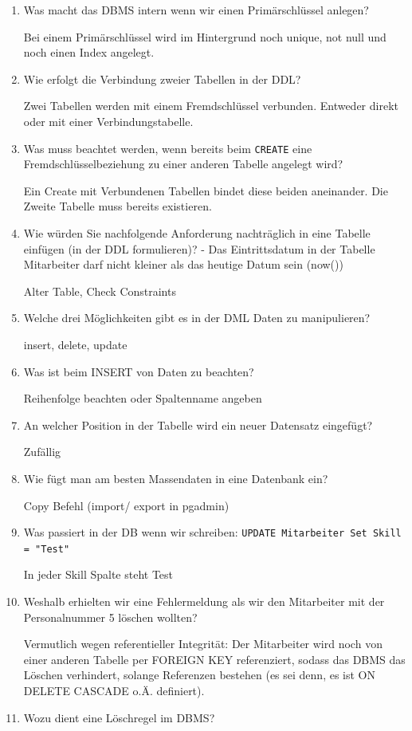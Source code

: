 \documentclass[a4paper]{article}
\begin{document}
\begin{enumerate}
    check, not null, default, unique, primary key, foreign key
    \item Was macht das DBMS intern wenn wir einen Primärschlüssel anlegen?
    
    Bei einem Primärschlüssel wird im Hintergrund noch unique, not null und noch einen Index angelegt.
    \item Wie erfolgt die Verbindung zweier Tabellen in der DDL?
    
    Zwei Tabellen werden mit einem Fremdschlüssel verbunden. Entweder direkt oder mit einer Verbindungstabelle.
    \item Was muss beachtet werden, wenn bereits beim \lstinline|CREATE| eine Fremdschlüsselbeziehung zu einer anderen Tabelle angelegt wird?
    
    Ein Create mit Verbundenen Tabellen bindet diese beiden aneinander. Die Zweite Tabelle muss bereits existieren.
    \item Wie würden Sie nachfolgende Anforderung nachträglich in eine Tabelle einfügen (in der DDL formulieren)? - Das Eintrittsdatum in der Tabelle Mitarbeiter darf nicht kleiner als das heutige Datum sein (now())
    
    Alter Table, Check Constraints
    \item Welche drei Möglichkeiten gibt es in der DML Daten zu manipulieren?
    
    insert, delete, update
    \item Was ist beim INSERT von Daten zu beachten?
    
    Reihenfolge beachten oder Spaltenname angeben
    \item An welcher Position in der Tabelle wird ein neuer Datensatz eingefügt?
    
    Zufällig
    \item Wie fügt man am besten Massendaten in eine Datenbank ein?
    
    Copy Befehl (import/ export in pgadmin)
    \item Was passiert in der DB wenn wir schreiben: \lstinline|UPDATE Mitarbeiter Set Skill = "Test"|
    
    In jeder Skill Spalte steht Test
    \item Weshalb erhielten wir eine Fehlermeldung als wir den Mitarbeiter mit der Personalnummer 5 löschen wollten?

    Vermutlich wegen referentieller Integrität: Der Mitarbeiter wird noch von einer anderen Tabelle per FOREIGN KEY referenziert, sodass das DBMS das Löschen verhindert, solange Referenzen bestehen (es sei denn, es ist ON DELETE CASCADE o.Ä. definiert).
    \item Wozu dient eine Löschregel im DBMS?


\end{enumerate}
\end{document}
